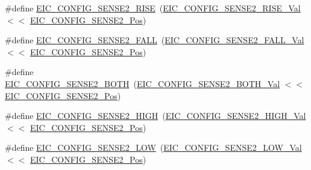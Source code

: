 \begin{DoxyCompactItemize}
\#define \mbox{\hyperlink{group___s_a_m_d21___e_i_c_ga13082e6745ab833b03c4ae3f6ac2987b}{E\+I\+C\+\_\+\+C\+O\+N\+F\+I\+G\+\_\+\+S\+E\+N\+S\+E2\+\_\+\+R\+I\+SE}}~(\mbox{\hyperlink{group___s_a_m_d21___e_i_c_ga4c6f24459946c4c716e15f887cf91732}{E\+I\+C\+\_\+\+C\+O\+N\+F\+I\+G\+\_\+\+S\+E\+N\+S\+E2\+\_\+\+R\+I\+S\+E\+\_\+\+Val}}    $<$$<$ \mbox{\hyperlink{group___s_a_m_d21___e_i_c_gaf67e9a2938eae7c6f9f4d19c405e243f}{E\+I\+C\+\_\+\+C\+O\+N\+F\+I\+G\+\_\+\+S\+E\+N\+S\+E2\+\_\+\+Pos}})
\item 
\#define \mbox{\hyperlink{group___s_a_m_d21___e_i_c_ga9fdf05ef44c96150dec20de4e599acca}{E\+I\+C\+\_\+\+C\+O\+N\+F\+I\+G\+\_\+\+S\+E\+N\+S\+E2\+\_\+\+F\+A\+LL}}~(\mbox{\hyperlink{group___s_a_m_d21___e_i_c_ga2f603343d04d42dfa3c238016be954b5}{E\+I\+C\+\_\+\+C\+O\+N\+F\+I\+G\+\_\+\+S\+E\+N\+S\+E2\+\_\+\+F\+A\+L\+L\+\_\+\+Val}}    $<$$<$ \mbox{\hyperlink{group___s_a_m_d21___e_i_c_gaf67e9a2938eae7c6f9f4d19c405e243f}{E\+I\+C\+\_\+\+C\+O\+N\+F\+I\+G\+\_\+\+S\+E\+N\+S\+E2\+\_\+\+Pos}})
\item 
\#define \mbox{\hyperlink{group___s_a_m_d21___e_i_c_ga714d2b832c236d31cca6edec3104a77d}{E\+I\+C\+\_\+\+C\+O\+N\+F\+I\+G\+\_\+\+S\+E\+N\+S\+E2\+\_\+\+B\+O\+TH}}~(\mbox{\hyperlink{group___s_a_m_d21___e_i_c_ga7809a27e221937b35d9e6b969a3771fb}{E\+I\+C\+\_\+\+C\+O\+N\+F\+I\+G\+\_\+\+S\+E\+N\+S\+E2\+\_\+\+B\+O\+T\+H\+\_\+\+Val}}    $<$$<$ \mbox{\hyperlink{group___s_a_m_d21___e_i_c_gaf67e9a2938eae7c6f9f4d19c405e243f}{E\+I\+C\+\_\+\+C\+O\+N\+F\+I\+G\+\_\+\+S\+E\+N\+S\+E2\+\_\+\+Pos}})
\item 
\#define \mbox{\hyperlink{group___s_a_m_d21___e_i_c_ga3b91ead92d5a5e553982a5cc7fae8bf8}{E\+I\+C\+\_\+\+C\+O\+N\+F\+I\+G\+\_\+\+S\+E\+N\+S\+E2\+\_\+\+H\+I\+GH}}~(\mbox{\hyperlink{group___s_a_m_d21___e_i_c_ga949642d01c96957d1e5f9279d3b48c2c}{E\+I\+C\+\_\+\+C\+O\+N\+F\+I\+G\+\_\+\+S\+E\+N\+S\+E2\+\_\+\+H\+I\+G\+H\+\_\+\+Val}}    $<$$<$ \mbox{\hyperlink{group___s_a_m_d21___e_i_c_gaf67e9a2938eae7c6f9f4d19c405e243f}{E\+I\+C\+\_\+\+C\+O\+N\+F\+I\+G\+\_\+\+S\+E\+N\+S\+E2\+\_\+\+Pos}})
\item 
\#define \mbox{\hyperlink{group___s_a_m_d21___e_i_c_ga6ccc3301fd3545d826b275289fb05c99}{E\+I\+C\+\_\+\+C\+O\+N\+F\+I\+G\+\_\+\+S\+E\+N\+S\+E2\+\_\+\+L\+OW}}~(\mbox{\hyperlink{group___s_a_m_d21___e_i_c_ga475f78069ac4ecbb6c2115497fa686f0}{E\+I\+C\+\_\+\+C\+O\+N\+F\+I\+G\+\_\+\+S\+E\+N\+S\+E2\+\_\+\+L\+O\+W\+\_\+\+Val}}     $<$$<$ \mbox{\hyperlink{group___s_a_m_d21___e_i_c_gaf67e9a2938eae7c6f9f4d19c405e243f}{E\+I\+C\+\_\+\+C\+O\+N\+F\+I\+G\+\_\+\+S\+E\+N\+S\+E2\+\_\+\+Pos}})
\item 
$$
\end{DoxyCompactItemize}
